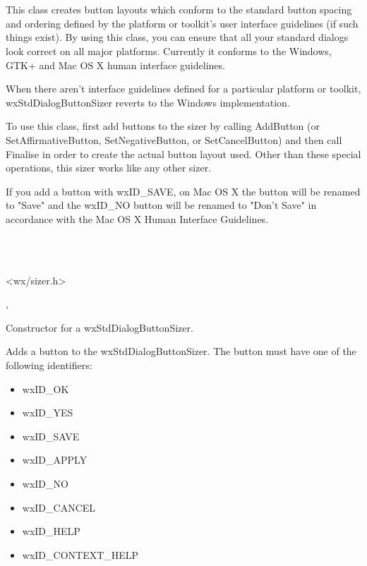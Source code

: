 \section{}\label{wxstddialogbuttonsizer}

This class creates button layouts which conform to the standard button spacing and ordering defined by the platform
or toolkit's user interface guidelines (if such things exist). By using this class, you can ensure that all your
standard dialogs look correct on all major platforms. Currently it conforms to the Windows, GTK+ and Mac OS X
human interface guidelines.

When there aren't interface guidelines defined for a particular platform or toolkit, wxStdDialogButtonSizer reverts
to the Windows implementation. 

To use this class, first add buttons to the sizer by calling AddButton (or SetAffirmativeButton, SetNegativeButton,
or SetCancelButton) and then call Finalise in order to create the actual button layout used. Other than these special
operations, this sizer works like any other sizer. 

If you add a button with wxID\_SAVE, on Mac OS X the button will be renamed to "Save" and
the wxID\_NO button will be renamed to "Don't Save" in accordance with the Mac OS X Human Interface Guidelines.


\\
\\


<wx/sizer.h>


, 


Constructor for a wxStdDialogButtonSizer.

\label{wxstddialogbuttonsizeraddbutton}


Adds a button to the wxStdDialogButtonSizer. The button must have one of the following identifiers:

\begin{itemize}
\item wxID\_OK
\item wxID\_YES
\item wxID\_SAVE
\item wxID\_APPLY
\item wxID\_NO
\item wxID\_CANCEL
\item wxID\_HELP
\item wxID\_CONTEXT\_HELP
\end{itemize}

